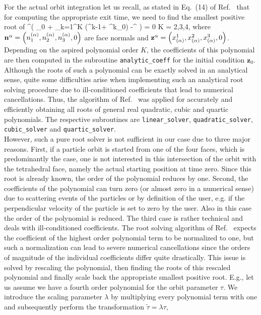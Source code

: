 \documentclass{TheMartianReport}
\newcommand{\red}[1]{#1} %
\newcommand{\blue}[1]{}  %
\begin{document}
%
For the actual orbit integration let us recall, as stated in Eq.~(14) of Ref.~ that for computing the appropriate exit time, we need to find the
smallest positive root of
\be{}
\bn^\alpha \cdot \left( \bz_0 + \sum\limits_{k=1}^K
\frac{\tau_{\red{e}\blue{d}}^k}{k!} \left(\hat \ba^{k-1}\cdot\bb + \hat \ba^k\cdot \bz_0\right)
-\bz^\alpha
\right) = 0 \quad {} \quad K = 2,3,4,
\ee
where ${\textbf{n}}^\alpha = \left(n_1^{(\alpha)},n_2^{(\alpha)},n_3^{(\alpha)},0\right)$
are face normals and
${\textbf{z}}^\alpha=\left(x^1_{(\alpha)},x^2_{(\alpha)},x^3_{(\alpha)},0\right)$. Depending on the aspired polynomial order $K$, the coefficients of this polynomial are then computed in the subroutine \texttt{analytic\_coeff} for the initial condition $\mathbf{z}_0$. Although the roots of such a polynomial can be exactly solved in an analytical sense, quite some difficulties arise when implementing such an analytical root solving procedure due to ill-conditioned coefficients that lead to numerical cancellations. Thus, the algorithm of Ref.~ was applied for accurately and efficiently obtaining all roots of general real quadratic, cubic and quartic polynomials. The respective subroutines are \texttt{linear\_solver}, \texttt{quadratic\_solver}, \texttt{cubic\_solver} and \texttt{quartic\_solver}.\\
%
However, such a pure root solver is not sufficient in our case due to three major reasons. First, if a particle orbit is started from one of the four faces, which is predominantly the case, one is not interested in this intersection of the orbit with the tetrahedral face, namely the actual starting position at time zero. Since this root is already known, the order of the polynomial reduces by one. Second, the coefficients of the polynomial can turn zero (or almost zero in a numerical sense) due to scattering events of the particles or by definition of the user, e.g. if the perpendicular velocity of the particle is set to zero by the user. Also in this case the order of the polynomial is reduced.
The third case is rather technical and deals with ill-conditioned coefficients. The root solving algorithm of Ref.~ expects the coefficient of the highest order polynomial term to be normalized to one, but such a normalization can lead to severe numerical cancellations since the orders of magnitude of the individual coefficients differ quite drastically. This issue is solved by rescaling the polynomial, then finding the roots of this rescaled polynomial and finally scale back the appropriate smallest positive root. E.g., let us assume we have a fourth order polynomial for the orbit parameter $\tau$. We introduce the scaling parameter $\lambda$ by multiplying every polynomial term with one and subsequently perform the transformation $\tilde{\tau} = \lambda \tau$,
\end{document}
